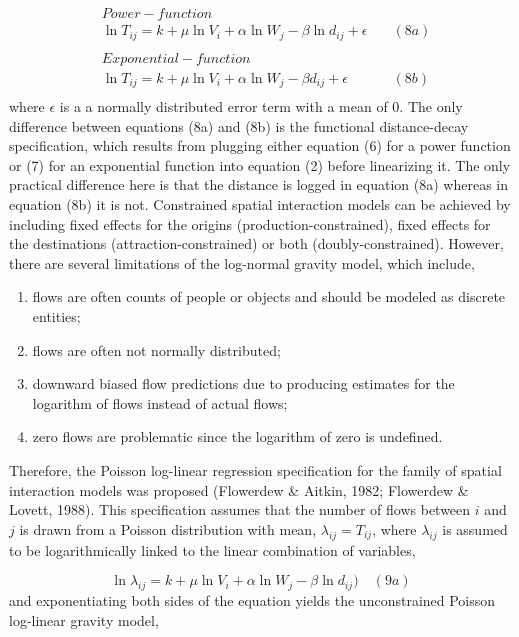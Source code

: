 \documentclass[11pt]{article}
\begin{document}
\[
\begin{align}
& Power-function \\
&\ln{T_{ij}} = k + \mu \ln{V_{i}} + \alpha \ln{W_{j}} - \beta \ln{d_{ij}} + \epsilon \quad &(8a) \\
\\
& Exponential-function \\
&\ln{T_{ij}} = k + \mu \ln{V_{i}} + \alpha \ln{W_{j}} - \beta {d_{ij}} + \epsilon \quad &(8b) \\
\end{align}
\]
%
where \(\epsilon\) is a a normally distributed error term with a mean of
0. The only difference between equations (8a) and (8b) is the functional
distance-decay specification, which results from plugging either
equation (6) for a power function or (7) for an exponential function
into equation (2) before linearizing it. The only practical difference
here is that the distance is logged in equation (8a) whereas in equation
(8b) it is not. Constrained spatial interaction models can be achieved
by including fixed effects for the origins (production-constrained),
fixed effects for the destinations (attraction-constrained) or both
(doubly-constrained). However, there are several limitations of the
log-normal gravity model, which include,

\begin{enumerate}
\def\labelenumi{\arabic{enumi}.}
\itemsep1pt\parskip0pt
\item
  flows are often counts of people or objects and should be modeled as
  discrete entities;
\item
  flows are often not normally distributed;
\item
  downward biased flow predictions due to producing estimates for the
  logarithm of flows instead of actual flows;
\item
  zero flows are problematic since the logarithm of zero is undefined.
\end{enumerate}

Therefore,  the Poisson log-linear
regression specification for the family of spatial interaction models was proposed (Flowerdew \& Aitkin, 1982; Flowerdew \& Lovett, 1988).
This specification assumes that the number of flows between \(i\) and
\(j\) is drawn from a Poisson distribution with mean,
\(\lambda_{ij} = T_{ij}\), where \(\lambda_{ij}\) is assumed to be
logarithmically linked to the linear combination of variables,

\[\ln{\lambda_{ij}} = k + \mu \ln V_{i} + \alpha \ln W_{j} - \beta \ln d_{ij}) \quad (9a)\]
%
and exponentiating both sides of the equation yields the unconstrained
Poisson log-linear gravity model,
\end{document}
